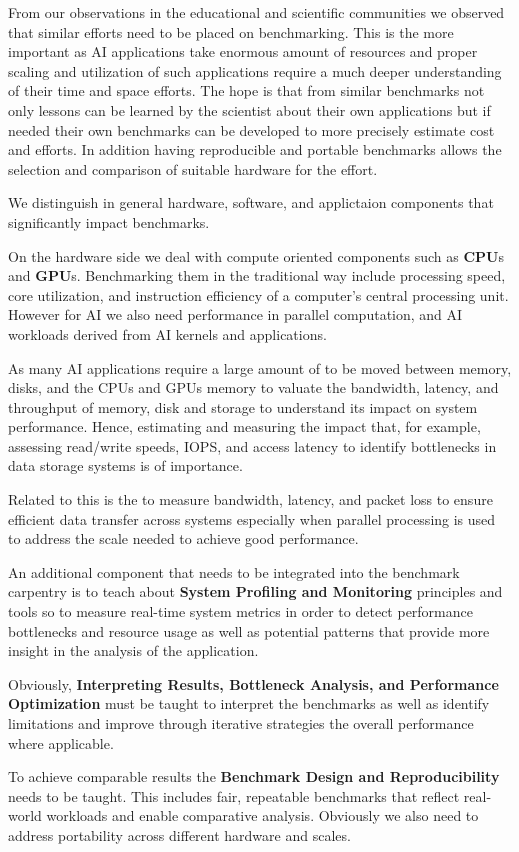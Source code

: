
From our observations in the educational and scientific communities we observed that similar efforts need to be placed on benchmarking.
This is the more important as AI applications take enormous amount of resources and proper scaling and utilization of such applications require a much deeper understanding of their time and space efforts.
The hope is that from similar benchmarks not only lessons can be learned by the scientist about their own applications but if needed their own benchmarks can be developed to more precisely estimate cost and efforts.
In addition having reproducible and portable benchmarks allows the selection and comparison of suitable hardware for the effort.

We distinguish in general hardware, software, and applictaion components that significantly impact benchmarks.

On the hardware side we deal with compute oriented components such as \textbf{CPU}s and \textbf{GPU}s.
Benchmarking them in the traditional way include processing speed, core utilization, and instruction efficiency of a computer's central processing unit. 
However for AI we also need performance in parallel computation, and AI workloads derived from AI kernels and applications.

As many AI applications require a large amount of  to be moved between memory, disks, and the CPUs and GPUs memory to valuate the bandwidth, latency, and throughput of memory, disk and storage to understand its impact on system performance.
Hence, estimating and measuring the impact that, for example, assessing read/write speeds, IOPS, and access latency to identify bottlenecks in data storage systems is of importance.

Related to this is the  to measure bandwidth, latency, and packet loss to ensure efficient data transfer across systems especially when parallel processing is used to address the scale needed to achieve good performance.

An additional component that needs to be integrated into the benchmark carpentry is to teach about \textbf{System Profiling and Monitoring} principles and tools so to measure real-time system metrics in order to detect performance bottlenecks and resource usage as well as potential patterns that provide more insight in the analysis of the application.

Obviously, \textbf{Interpreting Results, Bottleneck Analysis, and Performance Optimization} must be taught to interpret the benchmarks as well as identify limitations and improve through iterative strategies the overall performance where applicable.

To achieve comparable results the \textbf{Benchmark Design and Reproducibility} needs to be taught.
This includes fair, repeatable benchmarks that reflect real-world workloads and enable comparative analysis. Obviously we also need to address portability across different hardware and scales.